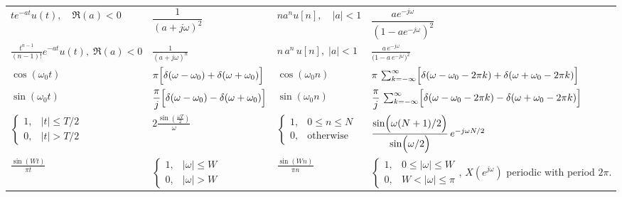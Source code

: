 \documentclass{article}
\begin{document}
\begin{multicols}{2}
\begin{table*}[ht]
\begin{tabular}{@{}llll@{}}
            $t e^{-at} u(t),\quad \Re(a)<0$                                & $\dfrac{1}{(a+j\omega)^2}$                                                    & $n a^n u[n],\quad |a|<1$                                                & $\dfrac{a e^{-j\omega}}{(1-a e^{-j\omega})^2}$                                                                                      \\ [1mm]
            $\frac{t^{n-1}}{(n-1)!}e^{-a t}u(t),\;\Re(a)<0$                & $\frac{1}{(a + j\omega)^n}$                                                   & $n\,a^n\,u[n],\;|a|<1$                                                  & $\frac{a\,e^{-j\omega}}{\bigl(1 - a\,e^{-j\omega}\bigr)^2}$                                                                         \\ [1mm]
            $\cos(\omega_0 t)$                                             & $\pi\Bigl[\delta(\omega-\omega_0) + \delta(\omega+\omega_0)\Bigr]$            & $\cos(\omega_0 n)$                                                      & $\pi\,\sum_{k=-\infty}^{\infty}\Bigl[\delta(\omega-\omega_0-2\pi k) + \delta(\omega+\omega_0-2\pi k)\Bigr]$                         \\ [1mm]
            $\sin(\omega_0 t)$                                             & $\dfrac{\pi}{j}\Bigl[\delta(\omega-\omega_0) - \delta(\omega+\omega_0)\Bigr]$ & $\sin(\omega_0 n)$                                                      & $\dfrac{\pi}{j}\,\sum_{k=-\infty}^{\infty}\Bigl[\delta(\omega-\omega_0-2\pi k) - \delta(\omega+\omega_0-2\pi k)\Bigr]$              \\ [1mm]
            $\begin{cases} 1, & |t| \le T/2 \\ 0, & |t| > T/2 \end{cases}$ & $2\frac{\sin\left(\frac{\omega T}{2}\right)}{\omega}$                         & $\begin{cases} 1, & 0 \le n \le N \\ 0, & \text{otherwise} \end{cases}$ & $\dfrac{\sin\Bigl(\omega (N+1)/2\Bigr)}{\sin\Bigl(\omega/2\Bigr)}\,e^{-j\omega N/2}$                                                \\ [1mm]
            $\frac{\sin\left(Wt\right)}{\pi t}$                            & $\begin{cases} 1, & |\omega| \le W \\ 0, & |\omega| > W \end{cases}$          & $\frac{\sin\left(Wn\right)}{\pi n}$                                     & $\begin{cases} 1, & 0 \leq |\omega| \le W \\ 0, & W < |\omega| \leq \pi \end{cases}$, $X(e^{j\omega})$ periodic with period $2\pi$. \\ [1mm]
            \bottomrule
        \end{tabular}
    \end{table*}


\end{multicols}
\end{document}
